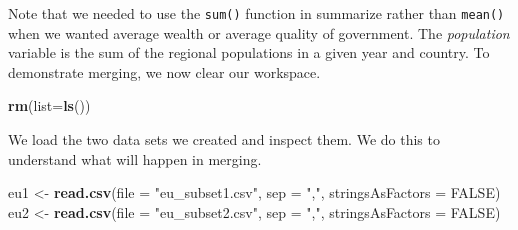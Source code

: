 \documentclass[]{article}
\newenvironment{Shaded}{\begin{snugshade}}{\end{snugshade}}
\newcommand{\DataTypeTok}[1]{\textcolor[rgb]{0.13,0.29,0.53}{#1}}
\newcommand{\DecValTok}[1]{\textcolor[rgb]{0.00,0.00,0.81}{#1}}
\newcommand{\KeywordTok}[1]{\textcolor[rgb]{0.13,0.29,0.53}{\textbf{#1}}}
\newcommand{\NormalTok}[1]{#1}
\newcommand{\OperatorTok}[1]{\textcolor[rgb]{0.81,0.36,0.00}{\textbf{#1}}}
\newcommand{\OtherTok}[1]{\textcolor[rgb]{0.56,0.35,0.01}{#1}}
\newcommand{\StringTok}[1]{\textcolor[rgb]{0.31,0.60,0.02}{#1}}
\begin{document}
\begin{Shaded}
\end{Shaded}

Note that we needed to use the \texttt{sum()} function in summarize rather than \texttt{mean()} when we wanted average wealth or average quality of government. The \emph{population} variable is the sum of the regional populations in a given year and country. To demonstrate merging, we now clear our workspace.

\begin{Shaded}
\begin{Highlighting}[]
\KeywordTok{rm}\NormalTok{(}\DataTypeTok{list=}\KeywordTok{ls}\NormalTok{())}
\end{Highlighting}
\end{Shaded}

We load the two data sets we created and inspect them. We do this to understand what will happen in merging.

\begin{Shaded}
\begin{Highlighting}[]
\NormalTok{eu1 <-}\StringTok{ }\KeywordTok{read.csv}\NormalTok{(}\DataTypeTok{file =} \StringTok{"eu_subset1.csv"}\NormalTok{, }\DataTypeTok{sep =} \StringTok{","}\NormalTok{, }\DataTypeTok{stringsAsFactors =} \OtherTok{FALSE}\NormalTok{)}
\NormalTok{eu2 <-}\StringTok{ }\KeywordTok{read.csv}\NormalTok{(}\DataTypeTok{file =} \StringTok{"eu_subset2.csv"}\NormalTok{, }\DataTypeTok{sep =} \StringTok{","}\NormalTok{, }\DataTypeTok{stringsAsFactors =} \OtherTok{FALSE}\NormalTok{)}
\end{Highlighting}
\end{Shaded}
\end{document}
